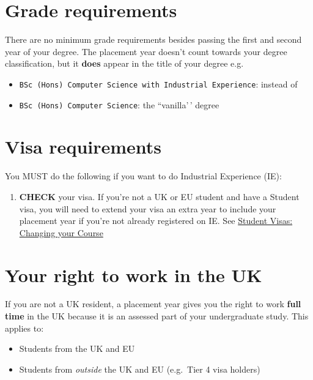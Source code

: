 \documentclass[
]{book}
\providecommand{\tightlist}{%
  \setlength{\itemsep}{0pt}\setlength{\parskip}{0pt}}
\begin{document}
\section{Grade requirements}\label{grade-requirements}

There are no minimum grade requirements besides passing the first and second year of your degree. The placement year doesn't count towards your degree classification, but it \textbf{does} appear in the title of your degree e.g.

\begin{itemize}
\tightlist
\item
  \texttt{BSc\ (Hons)\ Computer\ Science\ with\ Industrial\ Experience}: instead of
\item
  \texttt{BSc\ (Hons)\ Computer\ Science}: the ``vanilla'\,' degree
\end{itemize}

\section{Visa requirements}\label{visa-requirements}

You MUST do the following if you want to do Industrial Experience (IE):

\begin{enumerate}
\def\labelenumi{\arabic{enumi}.}
\tightlist
\item
  \textbf{CHECK} your visa. If you're not a UK or EU student and have a Student visa, you will need to extend your visa an extra year to include your placement year if you're not already registered on IE. See \href{documents.manchester.ac.uk/display.aspx?DocID=37044}{Student Visas: Changing your Course} \citep{changing}
\end{enumerate}

\section{Your right to work in the UK}\label{uk}

If you are not a UK resident, a placement year gives you the right to work \textbf{full time} in the UK because it is an assessed part of your undergraduate study. \citep{righttowork, workingduringstudy} This applies to:

\begin{itemize}
\tightlist
\item
  Students from the UK and EU
\item
  Students from \emph{outside} the UK and EU (e.g.~Tier 4 visa holders)
\end{itemize}
\end{document}
